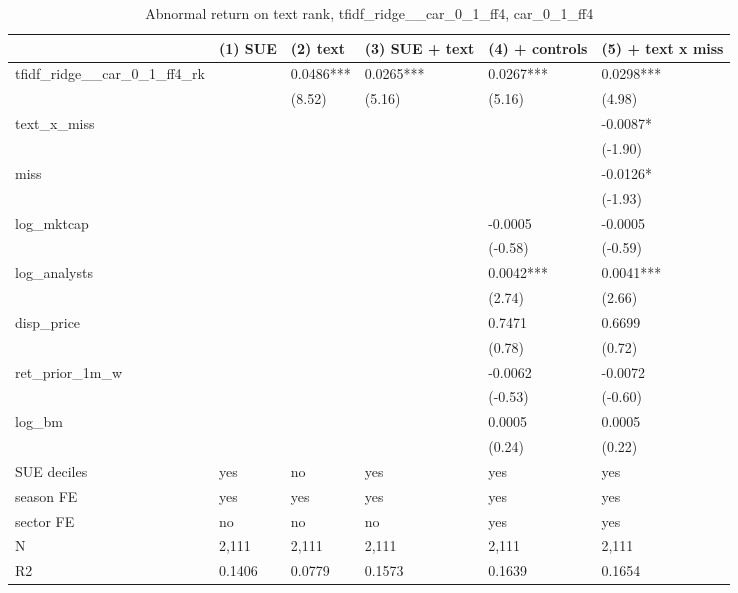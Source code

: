 \begin{table}
\caption{Abnormal return on text rank, tfidf_ridge__car_0_1_ff4, car_0_1_ff4}
\label{tab:t8_regressions__tfidf_ridge__car_0_1_ff4__car_0_1_ff4__validation}
\begin{tabular}{llllll}
\toprule
 & (1) SUE & (2) text & (3) SUE + text & (4) + controls & (5) + text x miss \\
\midrule
tfidf\_ridge\_\_car\_0\_1\_ff4\_rk &  & 0.0486*** & 0.0265*** & 0.0267*** & 0.0298*** \\
 &  & (8.52) & (5.16) & (5.16) & (4.98) \\
text\_x\_miss &  &  &  &  & -0.0087* \\
 &  &  &  &  & (-1.90) \\
miss &  &  &  &  & -0.0126* \\
 &  &  &  &  & (-1.93) \\
log\_mktcap &  &  &  & -0.0005 & -0.0005 \\
 &  &  &  & (-0.58) & (-0.59) \\
log\_analysts &  &  &  & 0.0042*** & 0.0041*** \\
 &  &  &  & (2.74) & (2.66) \\
disp\_price &  &  &  & 0.7471 & 0.6699 \\
 &  &  &  & (0.78) & (0.72) \\
ret\_prior\_1m\_w &  &  &  & -0.0062 & -0.0072 \\
 &  &  &  & (-0.53) & (-0.60) \\
log\_bm &  &  &  & 0.0005 & 0.0005 \\
 &  &  &  & (0.24) & (0.22) \\
SUE deciles & yes & no & yes & yes & yes \\
season FE & yes & yes & yes & yes & yes \\
sector FE & no & no & no & yes & yes \\
N & 2,111 & 2,111 & 2,111 & 2,111 & 2,111 \\
R2 & 0.1406 & 0.0779 & 0.1573 & 0.1639 & 0.1654 \\
\bottomrule
\end{tabular}
\end{table}
